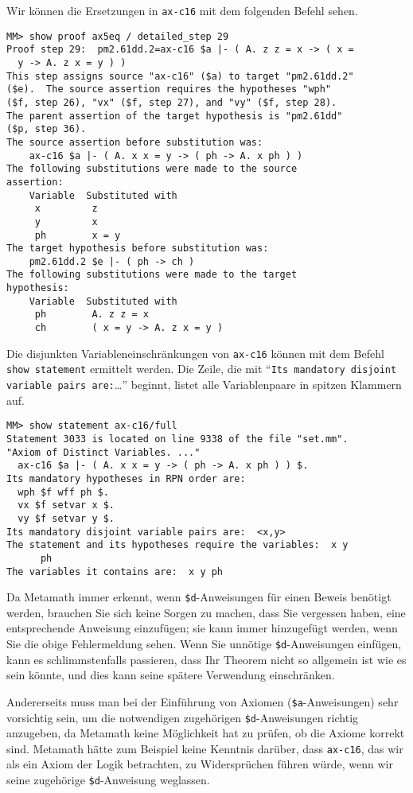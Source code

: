 Wir können die Ersetzungen in \texttt{ax-c16} mit dem folgenden Befehl sehen.

\begin{verbatim}
MM> show proof ax5eq / detailed_step 29
Proof step 29:  pm2.61dd.2=ax-c16 $a |- ( A. z z = x -> ( x =
  y -> A. z x = y ) )
This step assigns source "ax-c16" ($a) to target "pm2.61dd.2"
($e).  The source assertion requires the hypotheses "wph"
($f, step 26), "vx" ($f, step 27), and "vy" ($f, step 28).
The parent assertion of the target hypothesis is "pm2.61dd"
($p, step 36).
The source assertion before substitution was:
    ax-c16 $a |- ( A. x x = y -> ( ph -> A. x ph ) )
The following substitutions were made to the source
assertion:
    Variable  Substituted with
     x         z
     y         x
     ph        x = y
The target hypothesis before substitution was:
    pm2.61dd.2 $e |- ( ph -> ch )
The following substitutions were made to the target
hypothesis:
    Variable  Substituted with
     ph        A. z z = x
     ch        ( x = y -> A. z x = y )
\end{verbatim}

Die disjunkten Variableneinschränkungen von \texttt{ax-c16} können mit dem Befehl \texttt{show state\-ment} ermittelt werden.  Die Zeile, die mit "`\texttt{Its mandatory
dis\-joint var\-i\-able pairs are:}\ldots"' beginnt, listet alle Variablenpaare in spitzen Klammern auf.

\begin{verbatim}
MM> show statement ax-c16/full
Statement 3033 is located on line 9338 of the file "set.mm".
"Axiom of Distinct Variables. ..."
  ax-c16 $a |- ( A. x x = y -> ( ph -> A. x ph ) ) $.
Its mandatory hypotheses in RPN order are:
  wph $f wff ph $.
  vx $f setvar x $.
  vy $f setvar y $.
Its mandatory disjoint variable pairs are:  <x,y>
The statement and its hypotheses require the variables:  x y
      ph
The variables it contains are:  x y ph
\end{verbatim}

Da Metamath immer erkennt, wenn \texttt{\$d}-Anweisungen für einen Beweis benötigt werden, brauchen Sie sich keine Sorgen zu machen, dass Sie vergessen haben, eine entsprechende Anweisung einzufügen; sie kann immer hinzugefügt werden, wenn Sie die obige Fehlermeldung sehen.  Wenn Sie unnötige \texttt{\$d}-Anweisungen einfügen, kann es schlimmstenfalls passieren, dass Ihr Theorem nicht so allgemein ist wie es sein könnte, und dies kann seine spätere Verwendung einschränken.

Andererseits muss man bei der Einführung von Axiomen (\texttt{\$a}-Anweisun\-gen) sehr vorsichtig sein, um die notwendigen zugehörigen \texttt{\$d}-Anweisungen richtig anzugeben, da Metamath keine Möglichkeit hat zu prüfen, ob die Axiome korrekt sind.  Metamath hätte zum Beispiel keine Kenntnis darüber, dass \texttt{ax-c16}, das wir als ein Axiom der Logik betrachten, zu Widersprüchen führen würde, wenn wir seine zugehörige \texttt{\$d}-Anweisung weglassen.

